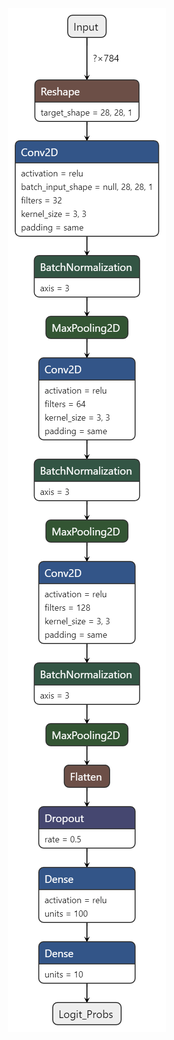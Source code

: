 \documentclass[11pt]{article}
\begin{document}
\begin{figure}[H]
\begin{subfigure}[c]{0.24\textwidth}
        \caption{}
        \label{fig:CNN4}
    \end{subfigure}
    \centering
    \begin{subfigure}[c]{0.24\textwidth}
        \centering
        \includegraphics[height =  0.95\textheight]{conv5.png}

\end{subfigure}
\end{figure}
\end{document}
